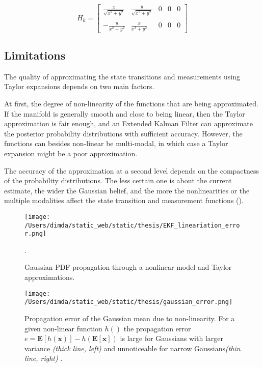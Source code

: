 \begin{equation}
\label{eq:linearize_radar}
H_k =
\begin{bmatrix}
\frac{x}{\sqrt{x^2+y^2}} &\frac{y}{\sqrt{x^2+y^2}} &0 &0 &0 \\\\
-\frac{y}{x^2+y^2} &\frac{x}{x^2+y^2} &0 &0 &0
\end{bmatrix}
\end{equation}

\subsection{Limitations}

The quality of approximating the state transitions and measurements using Taylor expansions depends on two main factors. 


At first, the degree of non-linearity of the functions that are being approximated. If the manifold is generally smooth and close to being linear, then the Taylor approximation is fair enough, and an Extended Kalman Filter can approximate the posterior probability distributions with sufficient accuracy. However, the functions can besides non-linear be multi-modal, in which case a Taylor expansion might be a poor approximation. 


The accuracy of the approximation at a second level depends on the compactness of the probability distributions. The less certain one is about the current estimate, the wider the Gaussian belief, and the more the nonlinearities or the multiple modalities affect the state transition and measurement functions ().

\begin{figure}[H]
	\centering
	\texttt{[image: /Users/dimda/static\_web/static/thesis/EKF\_lineariation\_error.png]}
	\caption{Gaussian PDF propagation through a nonlinear model and Taylor-approximations\cite{Thrun2005}.}.
	\label{fig:taylor_approximation}
\end{figure}


\begin{figure}[H]
	\centering
	\texttt{[image: /Users/dimda/static\_web/static/thesis/gaussian\_error.png]}
	
	\caption{Propagation error  of the Gaussian mean due to non-linearity. For a given non-linear function $h()$ the propagation error $e=\mathbf{E}[h(\mathbf{x})]-h(\mathbf{E}[\mathbf{x}])$ is large for Gaussians with larger variance \textit{(thick line, left)} and unnoticeable for narrow Gaussians\textit{(thin line, right)} \cite{Sola2011}.}
		
	\label{fig:taylor_approximation2}
\end{figure}


